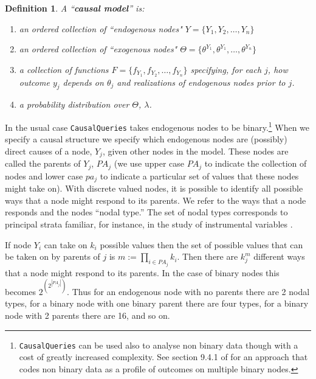 \documentclass[
  11pt,
  article]{jss}
\newtheorem{definition}{Definition}
\begin{document}
\begin{definition}
  
  A ``\textbf{causal model}'' is:
  \begin{enumerate}
    \item an ordered collection of ``endogenous nodes" $Y = \{Y_1, Y_2, \dots, Y_n\}$
    \item an ordered collection of ``exogenous nodes" $\Theta = \{\theta^{Y_1}, \theta^{Y_1}, \dots, \theta^{Y_n}\}$
    \item a collection of functions $F = \{f_{Y_1}, f_{Y_2}, \dots, f_{Y_n}\}$ specifying, for each $j$, how outcome $y_j$ depends on $\theta_j$ and realizations of endogenous nodes prior to $j$.
    \item a probability distribution over $\Theta$, $\lambda$.
  \end{enumerate}
  
\end{definition}

In the usual case \texttt{CausalQueries} takes endogenous nodes to be
binary.\footnote{\texttt{CausalQueries} can be used also to analyse non
  binary data though with a cost of greatly increased complexity. See
  section 9.4.1 of \citet{ii2023} for an approach that codes non binary
  data as a profile of outcomes on multiple binary nodes.} When we
specify a causal structure we specify which endogenous nodes are
(possibly) direct causes of a node, \(Y_j\), given other nodes in the
model. These nodes are called the parents of \(Y_j\), \(PA_j\) (we use
upper case \(PA_j\) to indicate the collection of nodes and lower case
\(pa_j\) to indicate a particular set of values that these nodes might
take on). With discrete valued nodes, it is possible to identify all
possible ways that a node might respond to its parents. We refer to the
ways that a node responds and the nodes ``nodal type.'' The set of nodal
types corresponds to principal strata familiar, for instance, in the
study of instrumental variables \citep{frangakis2002principal}.

If node \(Y_i\) can take on \(k_i\) possible values then the set of
possible values that can be taken on by parents of \(j\) is
\(m :=\prod_{i\in PA_j}k_i\). Then there are \(k_j^{m}\) different ways
that a node might respond to its parents. In the case of binary nodes
this becomes \(2^{\left(2^{|PA_j|}\right)}\). Thus for an endogenous
node with no parents there are 2 nodal types, for a binary node with one
binary parent there are four types, for a binary node with 2 parents
there are 16, and so on.
\end{document}
